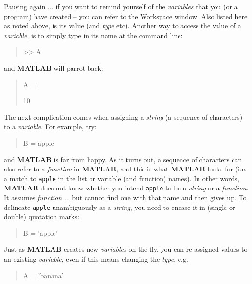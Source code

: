 \documentclass{tufte-book} %
\newenvironment{docspec}{\begin{quotation}\ttfamily\parskip0pt\parindent0pt\ignorespaces}{\end{quotation}}
\begin{document}
Pausing again ... if you want to remind yourself of the \textit{variables} that you (or a program) have created -- you can refer to the \textsf{Workspace} window. Also listed here as noted above, is its value (and \textit{type} etc). Another way to access the value of a \textit{variable}, is to simply type in its name at the command line:

\begin{docspec}
>> A
\end{docspec}

\noindent and \textbf{MATLAB} will parrot back:

\begin{docspec}
A =

    10
\end{docspec}

The next complication comes when assigning a \textit{string} (a sequence of characters) to a \textit{variable}. For example, try:

\begin{docspec}
B = apple
\end{docspec}

\noindent and \textbf{MATLAB} is far from happy. As it turns out,  a sequence of characters  can also refer to a \textit{function} in \textbf{MATLAB}, and this is what \textbf{MATLAB} looks for (i.e. a match to \texttt{apple} in the list or variable (and function) names). In other words, \textbf{MATLAB} does not know whether you intend \texttt{apple} to be a \textit{string} or a \textit{function}. It assumes \textit{function} ... but cannot find one with that name and then gives up. To delineate \texttt{apple} unambiguously as a \textit{string}, you need to encase it in (single or double) quotation marks:

\begin{docspec}
B = 'apple'
\end{docspec}

Just as \textbf{MATLAB} creates new \textit{variables} on the fly, you can re-assigned values to an existing \textit{variable}, even if this means changing the \textit{type}, e.g.

\begin{docspec}
A = 'banana'
\end{docspec}
\end{document}
